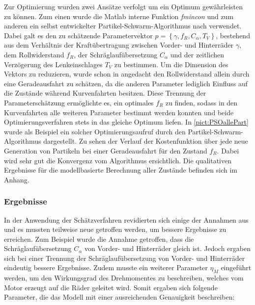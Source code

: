 Zur Optimierung wurden zwei Ansätze verfolgt um ein Optimum gewährleisten zu können. Zum einen wurde die Matlab interne Funktion \textit{fmincon} und zum anderen ein selbst entwickelter Partikel-Schwarm-Algorithmus nach \cite{PSO} verwendet. Dabei galt es den zu schätzende Parametervektor $p=\left \{ \gamma, f_R, C_{\alpha}, T_V\right \}$, bestehend aus dem Verhältnis der Kraftübertragung zwischen Vorder- und Hinterräder $\gamma$, dem Rollwiderstand $f_R$, der Schräglaufübersetzung $C_{\alpha}$ und der zeitlichen Verzögerung des Lenkeinschlages $T_V$ zu bestimmen. Um die Dimension des Vektors zu reduzieren, wurde schon in \cite{VikAnd} angedacht den Rollwiderstand allein durch eine Geradeausfahrt zu schätzen, da die anderen Parameter lediglich Einfluss auf die Zustände während Kurvenfahrten besitzen. Diese Trennung der Parameterschätzung ermöglichte es, ein optimales $f_R$ zu finden, sodass in den Kurvenfahrten alle weiteren Parameter bestimmt werden konnten und beide Optimierungsverfahren stets in das gleiche Optimum liefen. In \ref{pict:PSOallePart} wurde als Beispiel ein solcher Optimierungsaufruf durch den Partikel-Schwarm-Algorithmus dargestellt. Zu sehen der Verlauf der Kostenfunktion über jede neue Generation von Partikeln bei einer Geradeausfahrt für den Zustand $f_R$. Dabei wird sehr gut die Konvergenz vom Algorithmus ersichtlich. Die qualitativen Ergebnisse für die modellbasierte Berechnung aller Zustände befinden sich im Anhang. 

\subsubsection{Ergebnisse}
In der Anwendung der Schätzverfahren revidierten sich einige der Annahmen aus \cite{VikAnd} und es mussten teilweise neue getroffen werden, um bessere Ergebnisse zu erreichen. Zum Beispiel wurde die Annahme getroffen, dass die Schräglaufübersetzung $C_{\alpha}$ von Vorder- und Hinterräder gleich ist. Jedoch ergaben sich bei einer Trennung der Schräglaufübersetzung von Vorder- und Hinterräder eindeutig bessere Ergebnisse. Zudem musste ein weiterer Parameter $\eta_M$ eingeführt werden, um den Wirkungsgrad des Drehmomentes zu beschreiben, welches vom Motor erzeugt auf die Räder geleitet wird. Somit ergaben sich folgende Parameter, die das Modell mit einer ausreichenden Genauigkeit beschreiben: 

